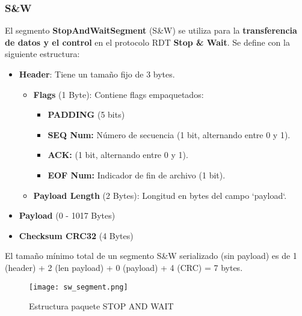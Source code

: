 \documentclass[a4paper,10pt]{article}
\begin{document}
\subsubsection{S\&W}
El segmento \textbf{StopAndWaitSegment} (S\&W) se utiliza para la \textbf{transferencia de datos y el control} en el protocolo RDT \textbf{Stop \& Wait}. Se define con la siguiente estructura:
\begin{itemize}
    \item \textbf{Header}: Tiene un tamaño fijo de 3 bytes.
    \begin{itemize}
        \item \textbf{Flags} (1 Byte): Contiene flags empaquetados:
        \begin{itemize}
        \item \textbf{PADDING} (5 bits)
        \item \textbf{SEQ Num:} Número de secuencia (1 bit, alternando entre 0 y 1).
        \item \textbf{ACK:} (1 bit, alternando entre 0 y 1).
        \item \textbf{EOF Num:} Indicador de fin de archivo (1 bit).
        \end{itemize}
        \item \textbf{Payload Length} (2 Bytes): Longitud en bytes del campo `payload`.
    \end{itemize}
    \item \textbf{Payload} (0 - 1017 Bytes)
    \item \textbf{Checksum CRC32} (4 Bytes)
\end{itemize}
El tamaño mínimo total de un segmento S\&W serializado (sin payload) es de 1 (header) + 2 (len payload) + 0 (payload) + 4 (CRC) = 7 bytes.
\begin{figure}[H]
    \centering
    \texttt{[image: sw\_segment.png]}
    \caption{Estructura paquete STOP AND WAIT}
\end{figure}
\end{document}
